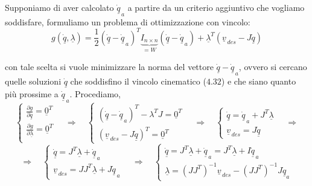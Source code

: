 \paragraph{}
Supponiamo di aver calcolato $\underline{\dot{q}}_{\,a}$ a partire da un criterio aggiuntivo che vogliamo soddisfare, formuliamo un problema di ottimizzazione con vincolo:
\begin{equation}
	g(\underline{\dot{q}}, \underline{\lambda}) = \frac{1}{2}(\underline{\dot{q}} - \underline{\dot{q}}_{\,a})^T \underbrace{I_{n \times n}}_{= W}(\underline{\dot{q}} - \underline{\dot{q}}_{\,a}) + \underline{\lambda}^T(\underline{v}_{\,des} - J\underline{\dot{q}})
\end{equation}

con tale scelta si vuole minimizzare la norma del vettore $\underline{\dot{q}} - \underline{\dot{q}}_{\,a}$, ovvero si cercano quelle soluzioni $\underline{\dot{q}}$ che soddisfino il vincolo cinematico ($4.32$) e che siano quanto più prossime a $\underline{\dot{q}}_{\,a}$. Procediamo,
\begin{equation*}
	\begin{cases}
		\frac{\partial g}{\partial \underline{\dot{q}}} = \underline{0}^T \\
		\frac{\partial g}{\partial \underline{\lambda}} = \underline{0}^T \\
	\end{cases}
	\quad \Rightarrow\quad
	\begin{cases}
		(\underline{\dot{q}}-\underline{\dot{q}}_{\,a})^T - \lambda^TJ = \underline{0}^T \\
		(\underline{v}_{\,des} - J\underline{\dot{q}})^T = \underline{0}^T
	\end{cases}
	\quad \Rightarrow \quad
	\begin{cases}
		\underline{\dot{q}} = \underline{\dot{q}}_{\,a} + J^T \underline{\lambda} \\
		\underline{v}_{\,des} = J \underline{\dot{q}}	
	\end{cases}
	\quad \Rightarrow
\end{equation*}
\begin{equation*}
	\Rightarrow \quad 
	\begin{cases}
		\underline{\dot{q}} = J^T \underline{\lambda} + \underline{\dot{q}}_{\,a} \\
		\underline{v}_{\,des} = JJ^T \underline{\lambda} + J \underline{\dot{q}}_{\,a}
	\end{cases}
	\quad \Rightarrow \quad
	\begin{cases}
		\underline{\dot{q}} = J^T \underline{\lambda} + \underline{\dot{q}}_{\,a} = J^T \underline{\lambda} + I\underline{\dot{q}}_{\,a} \\
		\underline{\lambda} = (JJ^T)^{-1} \underline{v}_{\,des} - (JJ^T)^{-1}J \underline{\dot{q}}_{a} 
	\end{cases}
\end{equation*}

